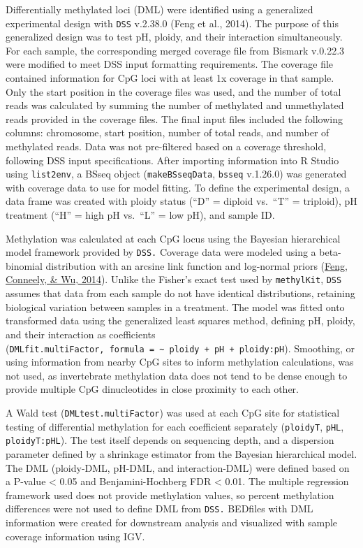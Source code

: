 \documentclass [11pt, proquest] {uwthesis}[2015/03/03]
\begin{document}
Differentially methylated loci (DML) were identified using a generalized experimental design with \texttt{DSS} v.2.38.0 (Feng et al., 2014). The purpose of this generalized design was to test pH, ploidy, and their interaction simultaneously. For each sample, the corresponding merged coverage file from Bismark v.0.22.3 were modified to meet DSS input formatting requirements. The coverage file contained information for CpG loci with at least 1x coverage in that sample. Only the start position in the coverage files was used, and the number of total reads was calculated by summing the number of methylated and unmethylated reads provided in the coverage files. The final input files included the following columns: chromosome, start position, number of total reads, and number of methylated reads. Data was not pre-filtered based on a coverage threshold, following DSS input specifications. After importing information into R Studio using \texttt{list2env}, a BSseq object (\texttt{makeBSseqData}, \texttt{bsseq} v.1.26.0) was generated with coverage data to use for model fitting. To define the experimental design, a data frame was created with ploidy status (``D'' = diploid vs.~``T'' = triploid), pH treatment (``H'' = high pH vs.~``L'' = low pH), and sample ID.

Methylation was calculated at each CpG locus using the Bayesian hierarchical model framework provided by \texttt{DSS.} Coverage data were modeled using a beta-binomial distribution with an arcsine link function and log-normal priors (\protect\hyperlink{ref-Feng2014}{Feng, Conneely, \& Wu, 2014}). Unlike the Fisher's exact test used by \texttt{methylKit}, \texttt{DSS} assumes that data from each sample do not have identical distributions, retaining biological variation between samples in a treatment. The model was fitted onto transformed data using the generalized least squares method, defining pH, ploidy, and their interaction as coefficients (\texttt{DMLfit.multiFactor,\ formula\ =\ \textasciitilde{}\ ploidy\ +\ pH\ +\ ploidy:pH}). Smoothing, or using information from nearby CpG sites to inform methylation calculations, was not used, as invertebrate methylation data does not tend to be dense enough to provide multiple CpG dinucleotides in close proximity to each other.

A Wald test (\texttt{DMLtest.multiFactor}) was used at each CpG site for statistical testing of differential methylation for each coefficient separately (\texttt{ploidyT}, \texttt{pHL}, \texttt{ploidyT:pHL}). The test itself depends on sequencing depth, and a dispersion parameter defined by a shrinkage estimator from the Bayesian hierarchical model. The DML (ploidy-DML, pH-DML, and interaction-DML) were defined based on a P-value \textless{} 0.05 and Benjamini-Hochberg FDR \textless{} 0.01. The multiple regression framework used does not provide methylation values, so percent methylation differences were not used to define DML from \texttt{DSS.} BEDfiles with DML information were created for downstream analysis and visualized with sample coverage information using IGV.
\end{document}
